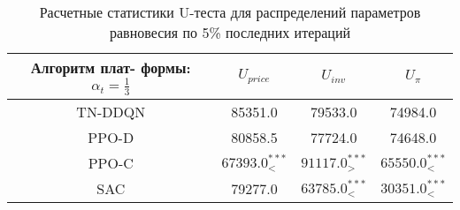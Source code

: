\bgroup
\def\arraystretch{1.25}
\begin{table}[H]
	\caption{Расчетные статистики U-теста для распределений параметров равновесия по 5\% последних итераций}
	\label{tables:U_fixed}
	\begin{center}
		\vspace{-0.5em}
		\begin{tabular}{c||ccc}
			\toprule
			\makecell{Алгоритм плат-\\ формы: $\alpha_t = \frac{1}{3}$} & $U_{price}$ & $U_{inv}$ & $U_{\pi}$ \\
			\midrule
			TN-DDQN & \makecell[c]{ 85351.0\\[1ex] } & \makecell[c]{ 79533.0\\[1ex] } & \makecell[c]{ 74984.0\\[1ex] } \\
			PPO-D & \makecell[c]{ 80858.5\\[1ex] } & \makecell[c]{ 77724.0\\[1ex] } & \makecell[c]{ 74648.0\\[1ex] } \\
			PPO-C & \makecell[c]{ $67393.0^{***}_{<} $\\[1ex] } & \makecell[c]{ $91117.0^{***}_{>} $\\[1ex] } & \makecell[c]{ $65550.0^{***}_{<} $\\[1ex] } \\
			SAC & \makecell[c]{ 79277.0\\[1ex] } & \makecell[c]{ $63785.0^{***}_{<} $\\[1ex] } & \makecell[c]{ $30351.0^{***}_{<} $\\[1ex] } \\
			\bottomrule
		\end{tabular}
	\end{center}
\end{table}
\egroup